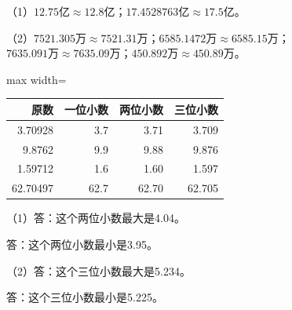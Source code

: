 
\begingroup\color{answerred}\noindent（1）$12.75$亿$\approx12.8$亿；$17.4528763$亿$\approx17.5$亿。\par
\noindent（2）$7521.305$万$\approx7521.31$万；$6585.1472$万$\approx6585.15$万；\\\hspace*{2em}$7635.091$万$\approx7635.09$万；$450.892$万$\approx450.89$万。\par\par\endgroup
{}
\begingroup\color{answerred}\begin{adjustbox}{max width=\linewidth}\begin{tabular}{rrrr}\toprule 原数&一位小数&两位小数&三位小数\\\midrule
3.70928&3.7&3.71&3.709\\9.8762&9.9&9.88&9.876\\1.59712&1.6&1.60&1.597\\62.70497&62.7&62.70&62.705\\\bottomrule\end{tabular}\end{adjustbox}\par\endgroup
{}
\begingroup\color{answerred}\noindent（1）答：这个两位小数最大是4.04。\par\hspace*{2em}答：这个两位小数最小是3.95。\par
\noindent（2）答：这个三位小数最大是5.234。\par\hspace*{2em}答：这个三位小数最小是5.225。\par\par\endgroup
